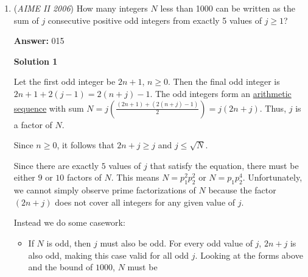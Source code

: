 \begin{enumerate}
First, by properties of cyclic quadrilterals, $<BGC = 180-<BAC=120$. Next, we notice quadrilateral AEFD is a parallelogram, and opposites angles are supplementary, and therefore $<ADF = 180-<BAC = 120$. Finally, by inscribed angles, $<BAG = <BCG$. Thus we can conclude $\triangle CBG \sim \triangle AFD$ by AA similarity. 

 Because $\triangle FAE \cong \triangle AFD$, $\triangle FAE \sim \triangle CBG$ aswell. So, we can write $\frac{BC}{AF} = \frac{BG}{DF} \to \frac{2\sqrt{3}}{\sqrt{433}} = \frac{BG}{11}$ since $AF = \sqrt{433}$ by the Law of Cosines. This gives $BG = \frac{22\sqrt{3}}{\sqrt{433}}$ and doing an identical process yields $CG = \frac{26\sqrt{3}}{\sqrt{433}}$. Thus, $[CBG] = \frac{26\sqrt{3}}{\sqrt{433}} \cdot \frac{22\sqrt{3}}{\sqrt{433}} \cdot \sin 120 = \frac{429\sqrt{3}}{433} \to p+q+r = \boxed{865}$.

 


	\item (\textit{AIME II 2006}) How many integers $N$ less than 1000 can be written as the sum of $j$ consecutive positive odd integers from exactly 5 values of $j\ge 1$?


 
 \textbf{Answer: }015



\textbf{Solution 1}

Let the first odd integer be $2n+1$, $n\geq 0$. Then the final odd integer is $2n+1 + 2(j-1) = 2(n+j) - 1$. The odd integers form an \href{https://artofproblemsolving.com/wiki/index.php?title=Arithmetic\_sequence}{arithmetic sequence} with sum $N = j\left(\frac{(2n+1) + (2(n+j)-1)}{2}\right) = j(2n+j)$. Thus, $j$ is a factor of $N$.

 Since $n\geq 0$, it follows that $2n+j \geq j$ and $j\leq \sqrt{N}$.

 Since there are exactly $5$ values of $j$ that satisfy the equation, there must be either $9$ or $10$ factors of $N$. This means $N=p_1^2p_2^2$ or $N=p_1p_2^4$. Unfortunately, we cannot simply observe prime factorizations of $N$ because the factor $(2n+j)$ does not cover all integers for any given value of $j$.

 Instead we do some casework:

 
            \begin{itemize}
        \item If $N$ is odd, then $j$ must also be odd. For every odd value of $j$, $2n+j$ is also odd, making this case valid for all odd $j$. Looking at the forms above and the bound of $1000$, $N$ must be
            \end{itemize}
            

\end{enumerate}
